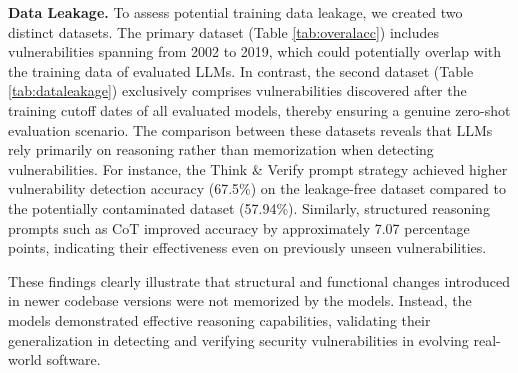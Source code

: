 \documentclass[sigconf]{acmart}
\begin{document}
\textbf{Data Leakage.} To assess potential training data leakage, we created two distinct datasets. The primary dataset (Table \ref{tab:overalacc}) includes vulnerabilities spanning from 2002 to 2019, which could potentially overlap with the training data of evaluated LLMs. In contrast, the second dataset (Table \ref{tab:dataleakage}) exclusively comprises vulnerabilities discovered after the training cutoff dates of all evaluated models, thereby ensuring a genuine zero-shot evaluation scenario. The comparison between these datasets reveals that LLMs rely primarily on reasoning rather than memorization when detecting vulnerabilities. For instance, the Think \& Verify prompt strategy achieved higher vulnerability detection accuracy (67.5\%) on the leakage-free dataset compared to the potentially contaminated dataset (57.94\%). Similarly, structured reasoning prompts such as CoT improved accuracy by approximately 7.07 percentage points, indicating their effectiveness even on previously unseen vulnerabilities.

These findings clearly illustrate that structural and functional changes introduced in newer codebase versions were not memorized by the models. Instead, the models demonstrated effective reasoning capabilities, validating their generalization in detecting and verifying security vulnerabilities in evolving real-world software.
\end{document}
